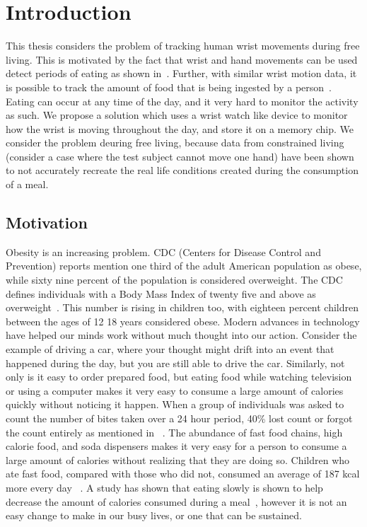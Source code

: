 
\chapter{Introduction}
This thesis considers the problem of tracking human wrist movements during free living.
This is motivated by the fact that wrist and hand movements can be used detect periods of eating
as shown in~\cite{dong2013detecting}. Further, with similar wrist motion data,
it is possible to track the amount of food that is being ingested by a person~\cite{dong2012new}.
Eating can occur at any time of the day, and it very hard to monitor the activity as such.
We propose a solution which uses a wrist watch like device to monitor how the wrist is moving throughout the day,
and store it on a memory chip. We consider the problem deuring free living,
because data from constrained living (consider a case where the test subject cannot move one hand)
have been shown to not accurately recreate the real life conditions created during the consumption of a meal.
\section{Motivation}
\label{Sec:Motivation}

 Obesity is an increasing problem. CDC (Centers for Disease Control and Prevention) reports mention one
 \textemdash{} third of the adult American population as 
 obese, while sixty nine percent of the population is considered 
 overweight. The CDC defines individuals with a Body Mass
 Index of twenty five and above as overweight~\cite{ogden2010prevalence}.
 This number is rising in children too, with eighteen
 percent children between the ages of 12 \textemdash{} 18
 years considered obese. Modern advances in technology
 have helped our minds work without much thought into our action.
 Consider the example of driving a car, where your thought might drift
 into an event that happened during the day, but you are still able to drive the car.
 Similarly, not only is it easy to order prepared food, but eating
 food while watching television or using a computer makes
 it very easy to consume a large amount of calories quickly without
 noticing it happen. When a group
 of individuals was asked to count the number of bites taken over
 a 24 hour period, 40\% lost count or forgot the count entirely as mentioned in ~\cite{mahoney1975obese}.
 The abundance of fast food chains, high calorie food, and soda dispensers makes it very easy
 for a person to consume a large amount of calories without realizing 
 that they are doing so. Children who ate fast food, compared with those who did not,
 consumed an average of 187 kcal more every day ~\cite{bowman2004effects}.
 A study has shown that eating slowly is shown to help decrease the amount of calories
 consumed during a meal~\cite{Andrade2008}, however it is not an
 easy change to make in our busy lives, or one that can be sustained.

